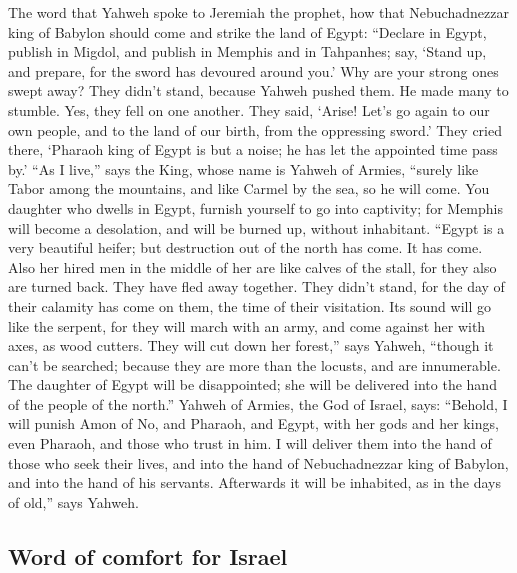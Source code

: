  The word that Yahweh spoke to Jeremiah the prophet, how
that Nebuchadnezzar king of Babylon should come and strike the land of
Egypt:  ``Declare in Egypt, publish in Migdol, and
publish in Memphis and in Tahpanhes; say, `Stand up, and prepare, for
the sword has devoured around you.'  Why are your strong
ones swept away? They didn't stand, because Yahweh pushed them.
 He made many to stumble. Yes, they fell on one another.
They said, `Arise! Let's go again to our own people, and to the land of
our birth, from the oppressing sword.'  They cried there,
`Pharaoh king of Egypt is but a noise; he has let the appointed time
pass by.'  ``As I live,'' says the King, whose name is
Yahweh of Armies, ``surely like Tabor among the mountains, and like
Carmel by the sea, so he will come.  You daughter who
dwells in Egypt, furnish yourself to go into captivity; for Memphis will
become a desolation, and will be burned up, without inhabitant.
 ``Egypt is a very beautiful heifer; but destruction out
of the north has come. It has come.  Also her hired men
in the middle of her are like calves of the stall, for they also are
turned back. They have fled away together. They didn't stand, for the
day of their calamity has come on them, the time of their visitation.
 Its sound will go like the serpent, for they will march
with an army, and come against her with axes, as wood cutters.
 They will cut down her forest,'' says Yahweh, ``though
it can't be searched; because they are more than the locusts, and are
innumerable.  The daughter of Egypt will be disappointed;
she will be delivered into the hand of the people of the north.''
 Yahweh of Armies, the God of Israel, says: ``Behold, I
will punish Amon of No, and Pharaoh, and Egypt, with her gods and her
kings, even Pharaoh, and those who trust in him.  I will
deliver them into the hand of those who seek their lives, and into the
hand of Nebuchadnezzar king of Babylon, and into the hand of his
servants. Afterwards it will be inhabited, as in the days of old,'' says
Yahweh.

\hypertarget{word-of-comfort-for-israel}{%
\subsection{Word of comfort for
Israel}\label{word-of-comfort-for-israel}}

